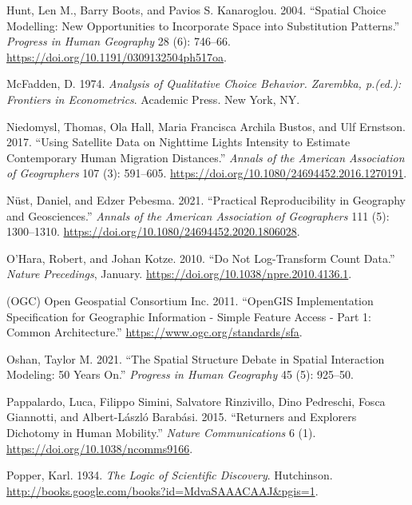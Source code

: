 \documentclass[11pt,letterpaper]{article}
\newlength{\cslhangindent}
\newlength{\cslentryspacingunit} %
\newenvironment{CSLReferences}[2] %
 {%
  \setlength{\parindent}{0pt}
  \ifodd #1
  \let\oldpar\par
  \def\par{\hangindent=\cslhangindent\oldpar}
  \fi
  \setlength{\parskip}{#2\cslentryspacingunit}
 }%
 {}
\begin{document}
\begin{CSLReferences}{1}{0}
\leavevmode{}%
Hunt, Len M., Barry Boots, and Pavios S. Kanaroglou. 2004. {``Spatial Choice Modelling: New Opportunities to Incorporate Space into Substitution Patterns.''} \emph{Progress in Human Geography} 28 (6): 746--66. \url{https://doi.org/10.1191/0309132504ph517oa}.

\leavevmode{}%
McFadden, D. 1974. \emph{Analysis of Qualitative Choice Behavior. Zarembka, p.(ed.): Frontiers in Econometrics}. Academic Press. New York, NY.

\leavevmode{}%
Niedomysl, Thomas, Ola Hall, Maria Francisca Archila Bustos, and Ulf Ernstson. 2017. {``Using Satellite Data on Nighttime Lights Intensity to Estimate Contemporary Human Migration Distances.''} \emph{Annals of the American Association of Geographers} 107 (3): 591--605. \url{https://doi.org/10.1080/24694452.2016.1270191}.

\leavevmode{}%
Nüst, Daniel, and Edzer Pebesma. 2021. {``Practical Reproducibility in Geography and Geosciences.''} \emph{Annals of the American Association of Geographers} 111 (5): 1300--1310. \url{https://doi.org/10.1080/24694452.2020.1806028}.

\leavevmode{}%
O'Hara, Robert, and Johan Kotze. 2010. {``Do Not Log-Transform Count Data.''} \emph{Nature Precedings}, January. \url{https://doi.org/10.1038/npre.2010.4136.1}.

\leavevmode{}%
(OGC) Open Geospatial Consortium Inc. 2011. {``OpenGIS Implementation Specification for Geographic Information - Simple Feature Access - Part 1: Common Architecture.''} \url{https://www.ogc.org/standards/sfa}.

\leavevmode{}%
Oshan, Taylor M. 2021. {``The Spatial Structure Debate in Spatial Interaction Modeling: 50 Years On.''} \emph{Progress in Human Geography} 45 (5): 925--50.

\leavevmode{}%
Pappalardo, Luca, Filippo Simini, Salvatore Rinzivillo, Dino Pedreschi, Fosca Giannotti, and Albert-László Barabási. 2015. {``Returners and Explorers Dichotomy in Human Mobility.''} \emph{Nature Communications} 6 (1). \url{https://doi.org/10.1038/ncomms9166}.

\leavevmode{}%
Popper, Karl. 1934. \emph{The Logic of Scientific Discovery}. Hutchinson. \url{http://books.google.com/books?id=MdvaSAAACAAJ\&pgis=1}.


\end{CSLReferences}
\end{document}
